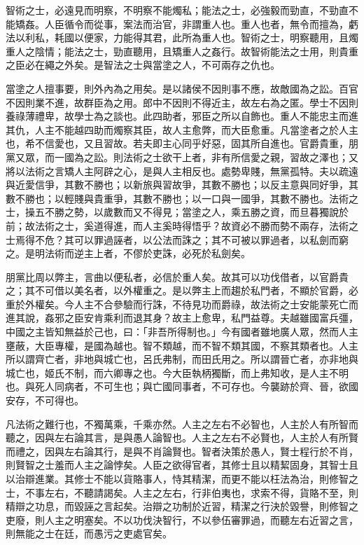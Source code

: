 
\begin{pinyinscope}
智術之士，必遠見而明察，不明察不能燭私；能法之士，必強毅而勁直，不勁直不能矯姦。人臣循令而從事，案法而治官，非謂重人也。重人也者，無令而擅為，虧法以利私，耗國以便家，力能得其君，此所為重人也。智術之士，明察聽用，且燭重人之陰情；能法之士，勁直聽用，且矯重人之姦行。故智術能法之士用，則貴重之臣必在繩之外矣。是智法之士與當塗之人，不可兩存之仇也。

當塗之人擅事要，則外內為之用矣。是以諸侯不因則事不應，故敵國為之訟。百官不因則業不進，故群臣為之用。郎中不因則不得近主，故左右為之匿。學士不因則養祿薄禮卑，故學士為之談也。此四助者，邪臣之所以自飾也。重人不能忠主而進其仇，人主不能越四助而燭察其臣，故人主愈弊，而大臣愈重。凡當塗者之於人主也，希不信愛也，又且習故。若夫即主心同乎好惡，固其所自進也。官爵貴重，朋黨又眾，而一國為之訟。則法術之士欲干上者，非有所信愛之親，習故之澤也；又將以法術之言矯人主阿辟之心，是與人主相反也。處勢卑賤，無黨孤特。夫以疏遠與近愛信爭，其數不勝也；以新旅與習故爭，其數不勝也；以反主意與同好爭，其數不勝也；以輕賤與貴重爭，其數不勝也；以一口與一國爭，其數不勝也。法術之士，操五不勝之勢，以歲數而又不得見；當塗之人，乘五勝之資，而旦暮獨說於前；故法術之士，奚道得進，而人主奚時得悟乎？故資必不勝而勢不兩存，法術之士焉得不危？其可以罪過誣者，以公法而誅之；其不可被以罪過者，以私劍而窮之。是明法術而逆主上者，不僇於吏誅，必死於私劍矣。

朋黨比周以弊主，言曲以便私者，必信於重人矣。故其可以功伐借者，以官爵貴之；其不可借以美名者，以外權重之。是以弊主上而趨於私門者，不顯於官爵，必重於外權矣。今人主不合參驗而行誅，不待見功而爵祿，故法術之士安能蒙死亡而進其說，姦邪之臣安肯乘利而退其身？故主上愈卑，私門益尊。夫越雖國富兵彊，中國之主皆知無益於己也，曰：「非吾所得制也。」今有國者雖地廣人眾，然而人主壅蔽，大臣專權，是國為越也。智不類越，而不智不類其國，不察其類者也。人主所以謂齊亡者，非地與城亡也，呂氏弗制，而田氏用之。所以謂晉亡者，亦非地與城亡也，姬氏不制，而六卿專之也。今大臣執柄獨斷，而上弗知收，是人主不明也。與死人同病者，不可生也；與亡國同事者，不可存也。今襲跡於齊、晉，欲國安存，不可得也。

凡法術之難行也，不獨萬乘，千乘亦然。人主之左右不必智也，人主於人有所智而聽之，因與左右論其言，是與愚人論智也。人主之左右不必賢也，人主於人有所賢而禮之，因與左右論其行，是與不肖論賢也。智者決策於愚人，賢士程行於不肖，則賢智之士羞而人主之論悖矣。人臣之欲得官者，其修士且以精絜固身，其智士且以治辯進業。其修士不能以貨賂事人，恃其精潔，而更不能以枉法為治，則修智之士，不事左右，不聽請謁矣。人主之左右，行非伯夷也，求索不得，貨賂不至，則精辯之功息，而毀誣之言起矣。治辯之功制於近習，精潔之行決於毀譽，則修智之吏廢，則人主之明塞矣。不以功伐決智行，不以參伍審罪過，而聽左右近習之言，則無能之士在廷，而愚污之吏處官矣。


\end{pinyinscope}
